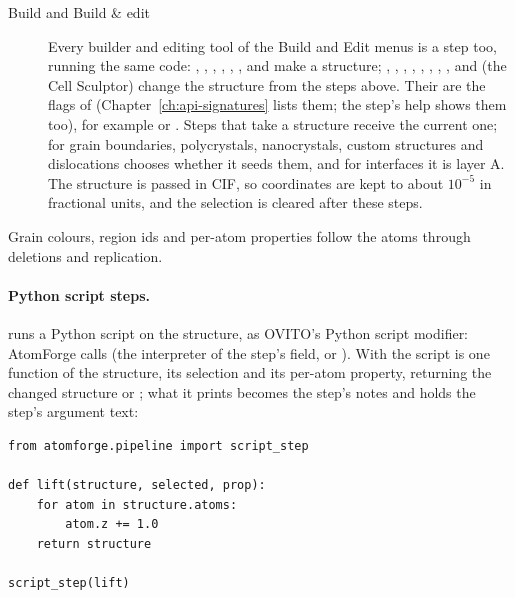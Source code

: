 \begin{description}
\item[Build and Build \& edit] Every builder and editing tool of the Build and Edit menus is a step too, running the same code: , , , , , ,  and  make a structure; , , , , , , , ,  and  (the Cell Sculptor) change the structure from the steps above. Their  are the flags of  (Chapter~\ref{ch:api-signatures} lists them; the step's help shows them too), for example  or . Steps that take a structure receive the current one; for grain boundaries, polycrystals, nanocrystals, custom structures and dislocations  chooses whether it seeds them, and for interfaces it is layer A. The structure is passed in CIF, so coordinates are kept to about $10^{-5}$ in fractional units, and the selection is cleared after these steps.
\end{description}
Grain colours, region ids and per-atom properties follow the atoms through deletions and replication.

\paragraph{Python script steps.}  runs a Python script on the structure, as OVITO's Python script modifier: AtomForge calls  (the interpreter of the step's  field,  or ). With  the script is one function of the structure, its selection and its per-atom property, returning the changed structure or ; what it prints becomes the step's notes and  holds the step's argument text:
\begin{lstlisting}
from atomforge.pipeline import script_step

def lift(structure, selected, prop):
    for atom in structure.atoms:
        atom.z += 1.0
    return structure

script_step(lift)
\end{lstlisting}

